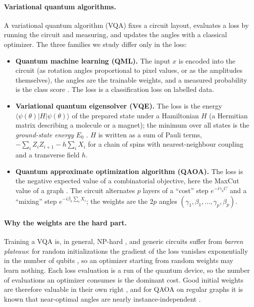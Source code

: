 \paragraph{Variational quantum algorithms.}
A variational quantum algorithm (VQA) \citep{cerezo2021variational} fixes a circuit layout, evaluates a loss by running the circuit and measuring, and updates the angles with a classical optimizer. The three families we study differ only in the loss:
\begin{itemize}
  \item \textbf{Quantum machine learning (QML).} The input $x$ is encoded into the circuit (as rotation angles proportional to pixel values, or as the amplitudes themselves), the angles are the trainable weights, and a measured probability is the class score \citep{mitarai2018quantum,schuld2020circuit,perezsalinas2020data}. The loss is a classification loss on labelled data.
  \item \textbf{Variational quantum eigensolver (VQE).} The loss is the energy $\langle \psi(\theta) | H | \psi(\theta) \rangle$ of the prepared state under a Hamiltonian $H$ (a Hermitian matrix describing a molecule or a magnet); the minimum over all states is the \emph{ground-state energy} $E_0$ \citep{peruzzo2014variational}. $H$ is written as a sum of Pauli terms, \eg\ $-\sum_i Z_i Z_{i+1} - h\sum_i X_i$ for a chain of spins with nearest-neighbour coupling and a transverse field $h$.
  \item \textbf{Quantum approximate optimization algorithm (QAOA).} The loss is the negative expected value of a combinatorial objective, here the MaxCut value of a graph \citep{farhi2014quantum}. The circuit alternates $p$ layers of a ``cost'' step $e^{-i\gamma_k C}$ and a ``mixing'' step $e^{-i\beta_k \sum_i X_i}$; the weights are the $2p$ angles $(\gamma_1, \beta_1, \ldots, \gamma_p, \beta_p)$.
\end{itemize}

\paragraph{Why the weights are the hard part.}
Training a VQA is, in general, NP-hard \citep{bittel2021training}, and generic circuits suffer from \emph{barren plateaus}: for random initializations the gradient of the loss vanishes exponentially in the number of qubits \citep{mcclean2018barren}, so an optimizer starting from random weights may learn nothing. Each loss evaluation is a run of the quantum device, so the number of evaluations an optimizer consumes is the dominant cost. Good initial weights are therefore valuable in their own right \citep{grant2019initialization,egger2021warm}, and for QAOA on regular graphs it is known that near-optimal angles are nearly instance-independent \citep{brandao2018fixed,zhou2020quantum,wurtz2021fixed}.

